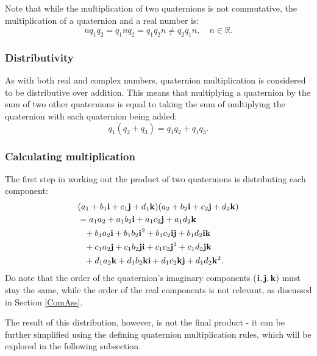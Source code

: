 \documentclass[10pt]{article}
\begin{document}
Note that while the multiplication of two quaternions is not commutative, the multiplication of a quaternion and a real number is:
\begin{equation}
    nq_1q_2 = q_1nq_2 = q_1q_2n \neq q_2q_1n, \quad n \in \mathbb{R}.
\end{equation}

\subsubsection{Distributivity}

As with both real and complex numbers, quaternion multiplication is considered to be distributive over addition. This means that multiplying a quaternion by the sum of two other quaternions is equal to taking the sum of multiplying the quaternion with each quaternion being added:
\begin{equation}
    q_1(q_2 + q_3) = q_1q_2 + q_1q_3.
\end{equation}

\subsubsection{Calculating multiplication} \label{InitialMult}

The first step in working out the product of two quaternions is distributing each component:
\begin{equation}
    \begin{aligned}
        & (a_1 + b_1\vb{i} + c_1\vb{j} + d_1\vb{k})(a_2 + b_2\vb{i} + c_2\vb{j} + d_2\vb{k}) \\
        & = a_1a_2 + a_1b_2\vb{i} + a_1c_2\vb{j} + a_1d_2\vb{k} \\
        & \phantom{=} + b_1a_2\vb{i} + b_1b_2\vb{i}^2 + b_1c_2\vb{i}\vb{j} + b_1d_2\vb{i}\vb{k} \\
        & \phantom{=} + c_1a_2\vb{j} + c_1b_2\vb{j}\vb{i} + c_1c_2\vb{j}^2 + c_1d_2\vb{j}\vb{k} \\
        & \phantom{=} + d_1a_2\vb{k} + d_1b_2\vb{k}\vb{i} + d_1c_2\vb{k}\vb{j} + d_1d_2\vb{k}^2.
    \end{aligned}
\end{equation}
Do note that the order of the quaternion's imaginary components ($\vb{i, j, k}$) must stay the same, while the order of the real components is not relevant, as discussed in Section \ref{ComAss}.

The result of this distribution, however, is not the final product - it can be further simplified using the defining quaternion multiplication rules, which will be explored in the following subsection.
\end{document}
